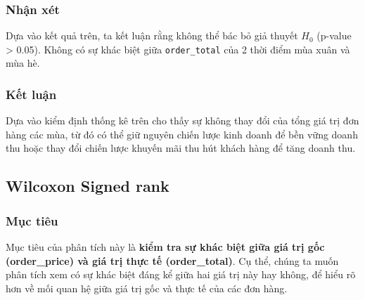 {\subsubsection{Nhận xét}
\begin{boxH}
Dựa vào kết quả trên, ta kết luận rằng không thể bác bỏ giả thuyết $H_0$ (p-value > 0.05). Không có sự khác biệt giữa \texttt{order\_total} của 2 thời điểm mùa xuân và mùa hè.
\end{boxH}
\subsubsection{Kết luận}
Dựa vào kiểm định thống kê trên cho thấy sự không thay đổi của tổng giá trị đơn hàng các mùa, từ đó có thể giữ nguyên chiến lược kinh doanh để bền vững doanh thu hoặc thay đổi chiến lược khuyến mãi thu hút khách hàng để tăng doanh thu.


\subsection{Wilcoxon Signed rank}
\subsubsection{Mục tiêu}
Mục tiêu của phân tích này là \textbf{kiểm tra sự khác biệt giữa giá trị gốc (order\_price) và giá trị thực tế (order\_total)}. Cụ thể, chúng ta muốn phân tích xem có sự khác biệt đáng kể giữa hai giá trị này hay không, để hiểu rõ hơn về mối quan hệ giữa giá trị gốc và thực tế của các đơn hàng.

}
